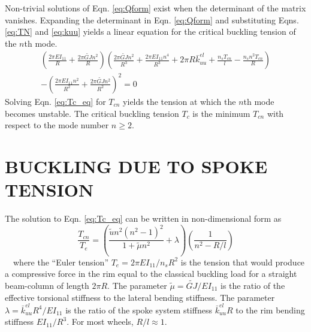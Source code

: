 \documentclass{bmd2016p}
\begin{document}
Non-trivial solutions of Eqn. \ref{eq:Qform} exist when the determinant of the matrix vanishes. Expanding the determinant in Eqn. \ref{eq:Qform} and substituting Eqns. \ref{eq:TN} and \ref{eq:kuu} yields a linear equation for the critical buckling tension of the $n$th mode.
	\begin{multline}\label{eq:Tc_eq}
	\left(\frac{2\pi EI_{11}}{R}+\frac{2\pi \widetilde{GJ}n^2}{R} \right) \left( \frac{2\pi \widetilde{GJ}n^2}{R^3} + \frac{2\pi EI_{11}n^4}{R^3} + 2\pi R\bar{k}_{uu}^{el} + \frac{n_sT_{cn}}{l} - \frac{n_sn^2T_{cn}}{R}\right)\\
	- \left( \frac{2\pi EI_{11}n^2}{R^2} + \frac{2\pi \widetilde{GJ}n^2}{R^2} \right)^2 = 0
	\end{multline}
Solving Eqn. \ref{eq:Tc_eq} for $T_{cn}$ yields the tension at which the $n$th mode becomes unstable. The critical buckling tension $T_c$ is the minimum $T_{cn}$ with respect to the mode number $n\geq 2$.



\section{BUCKLING DUE TO SPOKE TENSION}
The solution to Eqn. \ref{eq:Tc_eq} can be written in non-dimensional form as
	\begin{equation}\label{eq:Tc_nondim}
	\frac{T_{cn}}{T_e} = \left( \frac{\tilde{u}n^2(n^2-1)^2}{1+\tilde{\mu}n^2} + \lambda \right) \left(\frac{1}{n^2-R/l} \right)
	\end{equation}
\,\,\,\, where the ``Euler tension'' $T_e=2\pi EI_{11}/n_sR^2$ is the tension that would produce a compressive force in the rim equal to the classical buckling load for a straight beam-column of length $2\pi R$. The parameter $\tilde{\mu} = \widetilde{GJ}/EI_{11}$ is the ratio of the effective torsional stiffness to the lateral bending stiffness. The parameter $\lambda = \bar{k}_{uu}^{el}R^4/EI_{11}$ is the ratio of the spoke system stiffness $\bar{k}_{uu}^{el}R$ to the rim bending stiffness $EI_{11}/R^3$. For most wheels, $R/l\approx 1$.
\end{document}

